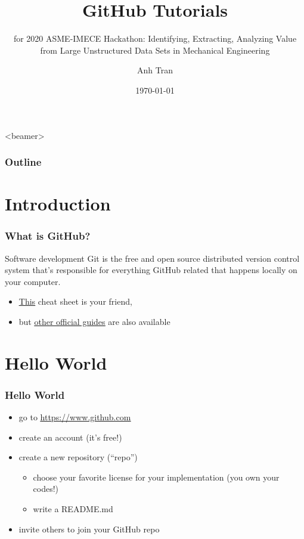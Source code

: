 \documentclass{beamer}
\title[GitHub Tutorials]
{GitHub Tutorials}
\subtitle
{for 2020 ASME-IMECE Hackathon: Identifying, Extracting, Analyzing Value from Large Unstructured Data Sets in Mechanical Engineering}
\author[Anh Tran]{Anh Tran}
\institute
{
 Optimization and Uncertainty Quantification Department \\
 Computer Science Research Institute \\
 Sandia National Laboratories \\
}
\date{\today}
\begin{document}

\begin{frame}
 \titlepage
\end{frame}

\begin{frame}<beamer>
 \frametitle{Outline}
 \tableofcontents
\end{frame}

\section{Introduction}

\begin{frame}
\frametitle{What is GitHub?}

\begin{block}{Software development}
Git is the free and open source distributed version control system that's responsible for everything GitHub related that happens locally on your computer. 
\end{block}



\begin{itemize}
\item \href{https://education.github.com/git-cheat-sheet-education.pdf}{\underline{This}} cheat sheet is your friend,
\item but \href{https://guides.github.com/}{\underline{other official guides}} are also available


\end{itemize}

\end{frame}


\section{Hello World}

\begin{frame}
\frametitle{Hello World}

\begin{itemize}
\item go to \href{https://www.github.com}{\underline{https://www.github.com}}
\item create an account (it's free!)
\item create a new repository (``repo'')
\begin{itemize}
\item choose your favorite license for your implementation (you own your codes!)
\item write a README.md
\end{itemize}
\item invite others to join your GitHub repo
\end{itemize}

\end{frame}
\end{document}
